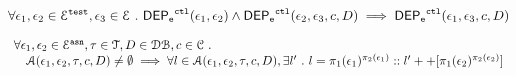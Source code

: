 \begin{lem}
\label{lem:ctl_trans}
\[
  \forall \mathtt{\epsilon}_1, \mathtt{\epsilon}_2 \in \mathcal{E}^{\mathtt{{test}}}, \mathtt{\epsilon}_3 \in \mathcal{E} ~.~
  \mathsf{DEP_{\mathtt{e}}}^{\mathtt{{ctl}}}(\mathtt{\epsilon}_1, \mathtt{\epsilon}_2) 
  \land \mathsf{DEP_{\mathtt{e}}}^{\mathtt{{ctl}}}(\mathtt{\epsilon}_2, \mathtt{\epsilon}_3, c, D)
  \implies \mathsf{DEP_{\mathtt{e}}}^{\mathtt{{ctl}}}(\mathtt{\epsilon}_1, \mathtt{\epsilon}_3, c, D)
\]
\end{lem}
%
%
%
\begin{lem}
\label{lem:inv_alg1}
\[
\begin{array}{l}
  \forall \mathtt{\epsilon}_1, \mathtt{\epsilon}_2 \in \mathcal{E}^{\mathtt{{asn}}}, \mathtt{\tau} \in \mathcal{T}, D \in \mathcal{DB} , c \in \mathcal{C} ~.~
  \\ \quad 
  \mathcal{A}(\mathtt{\epsilon}_1, \mathtt{\epsilon}_2, \mathtt{\tau}, c, D) \neq \emptyset
  \implies
  \forall l \in \mathcal{A}(\mathtt{\epsilon}_1, \mathtt{\epsilon}_2, \mathtt{\tau}, c, D), \exists l' ~.~ l = \pi_1(\mathtt{\epsilon}_1)^{\pi_2(\mathtt{\epsilon}_1)} :: l' ++ [\pi_1(\mathtt{\epsilon}_2)^{\pi_2(\mathtt{\epsilon}_2)}]
\end{array}
\]
\end{lem}
%
